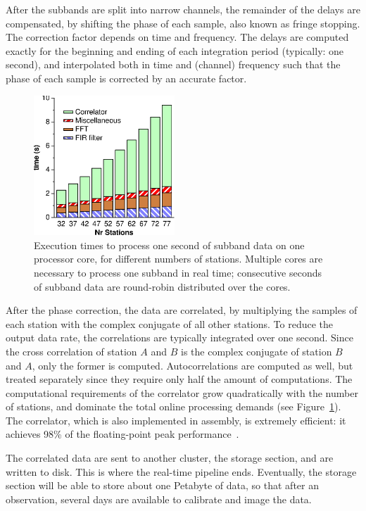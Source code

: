 \documentclass[journal]{IEEEtran}
\begin{document}
After the subbands are split into narrow channels, the remainder of the
delays are compensated, by shifting the phase of each sample, also known as
fringe stopping.
The correction factor depends on time and frequency.
The delays are computed exactly for the beginning and ending of each
integration period (typically: one second), and interpolated both in time
and (channel) frequency such that the phase of each sample is corrected by
an accurate factor.

\begin{figure}
\begin{center}
\includegraphics[width=53mm]{speed.eps}
\end{center}
\caption{Execution times to process one second of subband data on one
processor core, for different numbers of stations.  Multiple cores are
necessary to process one subband in real time; consecutive seconds of subband
data are round-robin distributed over the cores.}
\label{fig:speed}
\end{figure}

After the phase correction, the data are correlated, by multiplying the
samples of each station with the complex conjugate of all other stations.
To reduce the output data rate, the correlations are typically integrated
over one second.
Since the cross correlation of station $A$ and $B$ is the complex conjugate
of station $B$ and $A$, only the former is computed.
Autocorrelations are computed as well, but treated separately since they
require only half the amount of computations.
The computational requirements of the correlator grow quadratically with the
number of stations, and dominate the total online processing demands (see
Figure~\ref{fig:speed}).
The correlator, which is also implemented in assembly, is extremely efficient:
it achieves 98\% of the floating-point peak performance~\cite{Romein:06}.

The correlated data are sent to another cluster, the storage section, and
are written to disk.
This is where the real-time pipeline ends.
Eventually, the storage section will be able to store about one Petabyte of
data, so that after an observation, several days are available to calibrate
and image the data.
\end{document}
